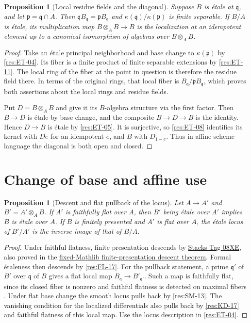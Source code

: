 \documentclass[11pt,oneside,openany]{book}
\newtheorem{proposition}[theorem]{Proposition}
\theoremstyle{definition}
\theoremstyle{remark}
\begin{document}
\begin{proposition}[Local residue fields and the diagonal]\label{res:ET-13}
Suppose $B$ is \'{e}tale at $\mathfrak q$, and let
$\mathfrak p=\mathfrak q\cap A$. Then
$\mathfrak qB_{\mathfrak q}=\mathfrak pB_{\mathfrak q}$ and
$\kappa(\mathfrak q)/\kappa(\mathfrak p)$ is finite separable.
If $B/A$ is \'{e}tale, its multiplication map
$B\otimes_A B\to B$ is the localization at an idempotent element
up to a canonical isomorphism of algebras over $B\otimes_A B$.
\end{proposition}
\begin{proof}
Take an \'{e}tale principal neighborhood and base change to
$\kappa(\mathfrak p)$ by \ref{res:ET-04}. Its fiber is a
finite product of finite separable extensions by \ref{res:ET-11}.
The local ring of the fiber at the point in question is therefore
the residue field there. In terms of the original rings, that local
fiber is $B_{\mathfrak q}/\mathfrak p B_{\mathfrak q}$, which
proves both assertions about the local rings and residue fields.

Put $D=B\otimes_A B$ and give it its $B$-algebra structure via
the first factor. Then $B\to D$ is \'{e}tale by base change, and
the composite $B\to D\to B$ is the identity. Hence $D\to B$ is
\'etale by \ref{res:ET-05}. It is surjective, so \ref{res:ET-08}
identifies its kernel with $De$ for an idempotent $e$, and
$B$ with $D_{1-e}$. Thus in affine scheme language the diagonal
is both open and closed.
\end{proof}

\section{Change of base and affine use}

\begin{proposition}[Descent and flat pullback of the locus]\label{res:ET-14}
Let $A\to A'$ and $B'=A'\otimes_A B$.
If $A'$ is faithfully flat over $A$, then $B'$ being \'{e}tale
over $A'$ implies $B$ is \'{e}tale over $A$.
If $B$ is finitely presented and $A'$ is flat over $A$, the
\'etale locus of $B'/A'$ is the inverse image of that of $B/A$.
\end{proposition}
\begin{proof}
Under faithful flatness, finite presentation descends by
\href{https://stacks.math.columbia.edu/tag/08XE}{Stacks Tag 08XE},
also proved in the
\href{https://github.com/leanprover-community/mathlib4/blob/56a005855ea17e0b0958f73ec801ae140b0a1679/Mathlib/RingTheory/Finiteness/Descent.lean\#L98}
{fixed-Mathlib finite-presentation descent theorem}.
Formal \'{e}taleness then descends by \ref{res:FL-17}.
For the pullback statement, a prime $\mathfrak q'$ of $B'$
over $\mathfrak q$ of $B$ gives a flat local map
$B_{\mathfrak q}\to B'_{\mathfrak q'}$. Such a map is faithfully
flat, since its closed fiber is nonzero and faithful flatness
is detected on maximal fibers \cite[Chapter 2]{p103}.
Under flat base change the smooth locus pulls back by
\ref{res:SM-13}. The vanishing condition for the localized
differentials also pulls back by \ref{res:KD-17} and faithful
flatness of this local map. Use the locus description in
\ref{res:ET-04}.
\end{proof}
\end{document}
